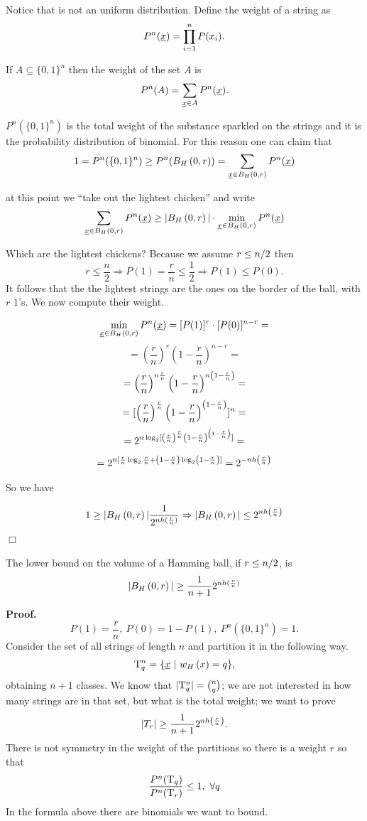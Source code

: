 Notice that is not an uniform distribution. Define the weight of a string as
$$P^n(\underline{x}) = \prod_{i = 1}^n P(x_i).$$

If $A \subseteq \{0, 1\}^n$ then the weight of the set $A$ is $$P^n(A) = \sum_{\underline{x} \in A} P^n(\underline{x}).$$

$P^n(\{0, 1\}^n)$ is the total weight of the substance sparkled on the strings and it is the probability distribution of binomial. For this reason one can claim that
$$1 = P^n(\{0, 1\}^n) \geq P^n(B_H\left(0, r\right)) = \sum_{\underline{x} \in B_H\left(0, r\right)} P^n(\underline{x})$$

at this point we ``take out the lightest chicken'' and write
$$\sum_{\underline{x} \in B_H\left(0, r\right)} P^n(\underline{x}) \geq |B_H\left(0, r\right)| \cdot \min_{\underline{x} \in B_H\left(0, r\right)}P^n(\underline{x})$$

Which are the lightest chickens? Because we assume $r \leq {n}/{2}$ then
$$r \leq \dfrac{n}{2} \Rightarrow P(1) = \dfrac{r}{n} \leq \dfrac{1}{2} \Rightarrow P(1) \leq P(0).$$
It follows that the the lightest strings are the ones on the border of the ball, with $r$ $1$'s. We now compute their weight.

\[\min_{\underline{x} \in B_H\left(0, r\right)}P^n(\underline{x}) = [P(1)]^r\cdot[P(0)]^{n-r} = \] 
\[ = \left(\dfrac{r}{n}\right)^r \left(1 - \dfrac{r}{n}\right)^{n-r} = \]  \[ = \left(\dfrac{r}{n}\right)^{n\frac{r}{n}} \left(1 - \dfrac{r}{n}\right)^{n\left(1 - \frac{r}{n}\right)} =\]
\[ = [\left(\dfrac{r}{n}\right)^{\frac{r}{n}} \left(1 - \dfrac{r}{n}\right)^{\left(1 - \frac{r}{n}\right)}]^n =\] 
\[ =2^{n\log_2[\left(\frac{r}{n}\right)^{\frac{r}{n}}  \left(1 - \frac{r}{n}\right)^{\left(1 - \frac{r}{n}\right)}]} = \]
\[ =2^{n[\frac{r}{n}\log_2\frac{r}{n} + \left(1 - \frac{r}{n}\right)\log_2\left(1 - \frac{r}{n}\right)]} = 2^{-nh\left(\frac{r}{n}\right)}\]

So we have 

\[1 \geq |B_H\left(0, r\right)| \dfrac{1}{2^{nh(\frac{r}{n})}} \Rightarrow |B_H\left(0, r\right)| \leq 2^{nh\left(\frac{r}{n}\right)}\] 
\hfill$\Box$


\begin{thm}
	The lower bound on the volume of a Hamming ball, if $ r \leq {n}/{2}$, is
	$$|B_H\left(0, r\right)| \geq \dfrac{1}{n+1}2^{nh(\frac{r}{n})}$$
\end{thm}

\noindent\textbf{Proof.} $$P(1) = \dfrac{r}{n},\ P(0) = 1 - P(1),\ P^n(\{0, 1\}^n) = 1.$$
Consider the set of all strings of length $n$ and partition it in the following way.
$$\mathrm{T}_q^n = \{\underline{x}\ |\ w_H\left(x\right) = q\},$$
obtaining $n +1$ classes. 
We know that $|\mathrm{T}_q^n| = \binom{n}{q}$; we are not interested in how many strings are in that set, but what is the total weight; we want to prove $$ |T_r| \geq \dfrac{1}{n+1}2^{nh\left(\frac{r}{n}\right)}.$$ There is not symmetry in the weight of the partitions so there is a weight $r$ so that
$$ \dfrac{P^n(\mathrm{T}_q)}{P^n(\mathrm{T}_r)} \leq 1,\ \forall q$$
In the formula above there are binomials we want to bound.

